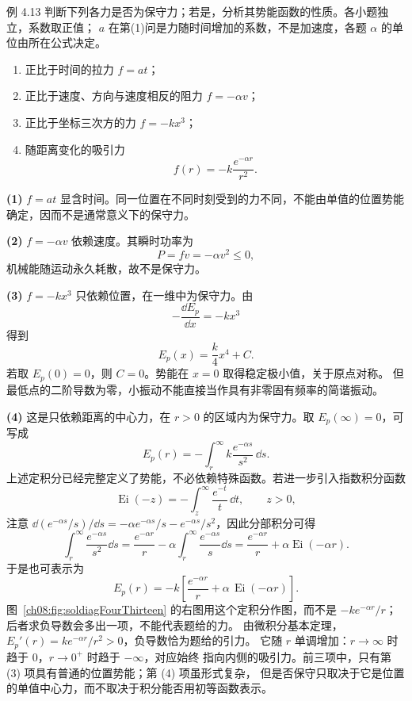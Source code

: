 \begin{origexamplebox}{例 4.13}
判断下列各力是否为保守力；若是，分析其势能函数的性质。各小题独立，系数取正值；
$a$ 在第(1)问是力随时间增加的系数，不是加速度，各题 $\alpha$ 的单位由所在公式决定。
\begin{enumerate}[label=\arabic*.,leftmargin=2.2em]
 \item 正比于时间的拉力 $f=a t$；
 \item 正比于速度、方向与速度相反的阻力 $f=-\alpha v$；
 \item 正比于坐标三次方的力 $f=-kx^3$；
 \item 随距离变化的吸引力
 \[
 f(r)=-k\frac{e^{-\alpha r}}{r^2}.
 \]
\end{enumerate}
\end{origexamplebox}

\begin{xesolution}
\textbf{(1)} $f=at$ 显含时间。同一位置在不同时刻受到的力不同，不能由单值的位置势能
确定，因而不是通常意义下的保守力。

\textbf{(2)} $f=-\alpha v$ 依赖速度。其瞬时功率为
\[
 P=fv=-\alpha v^2\le0,
\]
机械能随运动永久耗散，故不是保守力。

\textbf{(3)} $f=-kx^3$ 只依赖位置，在一维中为保守力。由
\[
 -\frac{\dd E_p}{\dd x}=-kx^3
\]
得到
\[
 \boxed{E_p(x)=\frac{k}{4}x^4+C}.
\]
若取 $E_p(0)=0$，则 $C=0$。势能在 $x=0$ 取得稳定极小值，关于原点对称。
但最低点的二阶导数为零，小振动不能直接当作具有非零固有频率的简谐振动。

\textbf{(4)} 这是只依赖距离的中心力，在 $r>0$ 的区域内为保守力。取
$E_p(\infty)=0$，可写成
\[
 \boxed{
 E_p(r)=-\int_r^\infty
 k\frac{e^{-\alpha s}}{s^2}\,\dd s}.
\]
上述定积分已经完整定义了势能，不必依赖特殊函数。若进一步引入指数积分函数
\[
 \operatorname{Ei}(-z)=-\int_z^\infty\frac{e^{-t}}{t}\,\dd t,\qquad z>0,
\]
注意 $\dd(e^{-\alpha s}/s)/\dd s=-\alpha e^{-\alpha s}/s-e^{-\alpha s}/s^2$，因此分部积分可得
\[
 \int_r^\infty\frac{e^{-\alpha s}}{s^2}\dd s
 =\frac{e^{-\alpha r}}r-\alpha\int_r^\infty\frac{e^{-\alpha s}}s\dd s
 =\frac{e^{-\alpha r}}r+\alpha\operatorname{Ei}(-\alpha r).
\]
于是也可表示为
\[
 E_p(r)
 =-k\left[
 \frac{e^{-\alpha r}}{r}
 +\alpha\,\operatorname{Ei}(-\alpha r)
 \right].
\]
\soldiagFourThirteen
图~\ref{ch08:fig:soldiagFourThirteen} 的右图用这个定积分作图，而不是 $-ke^{-\alpha r}/r$；后者求负导数会多出一项，不能代表题给的力。
由微积分基本定理，$E_p'(r)=ke^{-\alpha r}/r^2>0$，负导数恰为题给的引力。
它随 $r$ 单调增加：$r\to\infty$ 时趋于 $0$，$r\to0^+$ 时趋于 $-\infty$，对应始终
指向内侧的吸引力。前三项中，只有第 (3) 项具有普通的位置势能；第 (4) 项虽形式复杂，
但是否保守只取决于它是位置的单值中心力，而不取决于积分能否用初等函数表示。
\end{xesolution}

